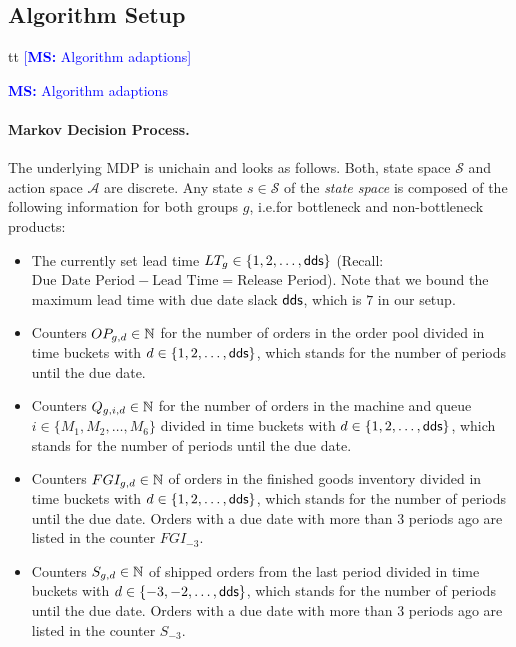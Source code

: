 \documentclass[envcountsame]{llncs}
\newcommand\MS[2][r]{\ifx t#1 \textcolor{blue}{[\textbf{MS:} #2]}
  \else \begin{center}\textcolor{blue}{\textbf{MS:} #2} \end{center} \fi}
\begin{document}
\subsection{Algorithm Setup}
\label{subsec:Algorithm_Setup}

\MS[t]{Algorithm adaptions}

\paragraph{Markov Decision Process.} The underlying MDP is unichain and looks as follows. Both,
state space $\mathcal{S}$ and action space $\mathcal{A}$ are discrete.
%
%
Any state $s \in \mathcal{S}$ of the \textit{state space} is composed of the following information
for both groups \(g\), i.e.\@ for bottleneck and non-bottleneck products:
\begin{itemize}

\item The currently set lead time $LT_{g} \in \{1,2,\ldots,\textsf{dds}\}$ (Recall:
  $\text{Due Date Period} - \text{Lead Time} = \text{Release Period}$). Note that we bound the
  maximum lead time with due date slack $\textsf{dds}$, which is $7$ in our setup.

\item Counters $OP_{g,d}\in \mathbb{N}$ for the number of orders in the order pool divided in time buckets
  with $d \in \{1,2,\ldots,\textsf{dds} \}$, which stands for the number of periods until the due date.


\item Counters $Q_{g,i,d}\in \mathbb{N}$ for the number of orders in the machine and queue \(i \in
  \{M_{1}, M_{2}, \ldots , M_{6}\}\) divided in
  time buckets with $d \in \{1,2,\ldots,\textsf{dds} \}$, which stands for the number of periods until the
  due date.

\item Counters $FGI_{g,d} \in \mathbb{N}$ of orders in the finished goods inventory divided in time
  buckets with $d \in \{1, 2,\ldots, \textsf{dds} \}$, which stands for the number of periods until the
  due date. Orders with a due date with more than 3 periods ago are listed in the counter
  $FGI_{-3}$.

\item Counters $S_{g,d} \in \mathbb{N}$ of shipped orders from the last period divided in time buckets
  with $d \in\{-3,-2,\ldots, \textsf{dds} \}$, which stands for the number of periods until the due date.
  Orders with a due date with more than 3 periods ago are listed in the counter $S_{-3}$.

\end{itemize}
\end{document}

